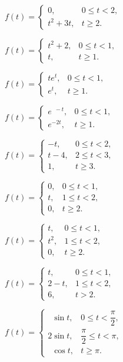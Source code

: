 \begin{exerciselistTwoColumn}
\item\label{exer:8.4.7}$f(t)=\begin{cases}
0, &0\le t<2,\\
t^2+3t,&t\ge2.\end{cases}$
\item\label{exer:8.4.8}$f(t)=\begin{cases}
t^2+2, &0\le t<1,\\
t,&t\ge1.\end{cases}$
\item\label{exer:8.4.9}$f(t)=\begin{cases}
te^t,& 0\le t<1,\\
e^t,&t\ge1.\end{cases}$
\item\label{exer:8.4.10}$f(t)=\begin{cases}
e^{\phantom{2}-t}, &0\le t<1,\\
e^{-2t},&t\ge1.\end{cases}$
\item\label{exer:8.4.11}$f(t)=\begin{cases}
-t,&0 \le t<2,\\
t-4,&2\le t<3,\\
1,&t\ge3.
\end{cases}$
\item\label{exer:8.4.12}$f(t)=\begin{cases}
0,&0 \le t<1,\\
t,&1\le t<2,\\
0,&t\ge2.\end{cases}$
\item\label{exer:8.4.13}$f(t)=\begin{cases}
t,&0 \le t<1,\\
t^2,&1\le t<2,\\
0,&t\ge2.\end{cases}$
\item\label{exer:8.4.14}$f(t)=\begin{cases}
t,&0\le t<1,\\
2-t,&1\le t<2,\\
6,&t > 2.\end{cases}$

\item\label{exer:8.4.15}\CGex $f(t)=\begin{cases}
\phantom{2}\sin t,&0\le t<\dfrac{\pi}{2},\\
2\sin t,&\dfrac{\pi}{2}\le t<\pi,\\
\phantom{2}\cos t,&t\ge\pi.\end{cases}$


\end{exerciselistTwoColumn}
